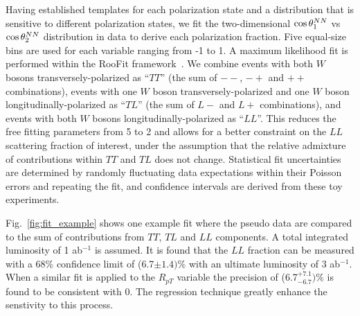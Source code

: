 Having established templates for each polarization state and a
distribution that is sensitive to different polarization states, 
we fit the two-dimensional $ \cos \theta^{NN}  _1$ vs $ \cos \theta^{NN}  _2$
distribution in data to derive each polarization fraction. Five equal-size bins 
are used for each \ctsNN variable ranging from -1 to 1. A maximum likelihood fit is performed 
within the RooFit framework~\cite{RooFit}. We combine events with both $W$ bosons transversely-polarized as
``$TT$'' (the sum of $--$, $-+$ and $++$ combinations), events with
one $W$ boson transversely-polarized and one $W$ boson
longitudinally-polarized as ``$TL$'' (the sum of $L-$ and $L+$
combinations), and events with both $W$ bosons
longitudinally-polarized as ``$LL$''. This reduces the free fitting parameters from 5 to 2 and 
allows for a better constraint on the $LL$ scattering fraction of interest, under the assumption that
the relative admixture of contributions within $TT$ and $TL$ does not change. Statistical fit uncertainties are determined by randomly
fluctuating data expectations within their Poisson errors and
repeating the fit, and confidence intervals are derived from these toy experiments.  


Fig.~\ref{fig:fit_example} shows one example fit where the pseudo data are compared to the sum of 
contributions from $TT$, $TL$ and $LL$ components. A total integrated luminosity of 1 ab$^{-1}$ is assumed.  It is found that the $LL$ fraction can be measured with a 68\% confidence limit of (6.7$\pm 1.4)\%$ with an ultimate luminosity of 3 ab$^{-1}$. When a similar fit is applied to the $R_{pT}$ variable the precision of (6.7$^{+7.1}_{- 6.7})\%$ is found to be consistent with 0. The regression technique greatly enhance the senstivity to this process.

